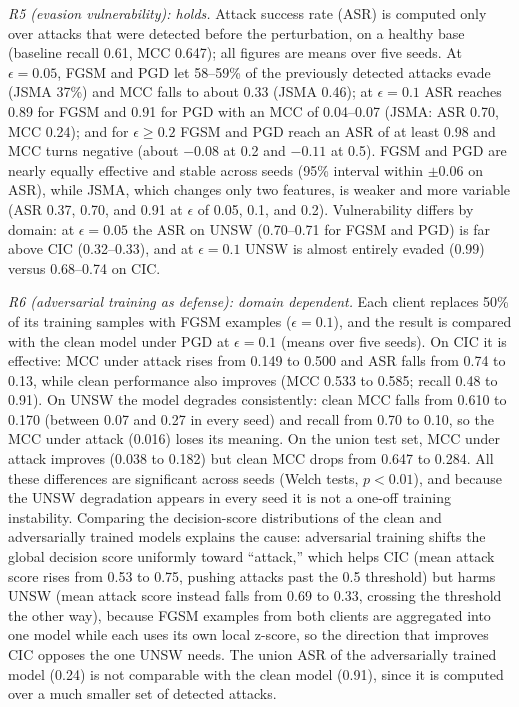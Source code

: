 \documentclass[conference]{IEEEtran}
\begin{document}
\textit{R5 (evasion vulnerability): holds.} Attack success rate (ASR) is computed only over
attacks that were detected before the perturbation, on a healthy base (baseline recall 0.61,
MCC 0.647); all figures are means over five seeds. At $\epsilon{=}0.05$, FGSM and PGD let
58--59\% of the previously detected attacks evade (JSMA 37\%) and MCC falls to about 0.33 (JSMA
0.46); at $\epsilon{=}0.1$ ASR reaches 0.89 for FGSM and 0.91 for PGD with an MCC of 0.04--0.07
(JSMA: ASR 0.70, MCC 0.24); and for $\epsilon{\geq}0.2$ FGSM and PGD reach an ASR of at least 0.98
and MCC turns negative (about $-0.08$ at 0.2 and $-0.11$ at 0.5). FGSM and PGD are nearly equally
effective and stable across seeds (95\% interval within $\pm$0.06 on ASR), while JSMA, which
changes only two features, is weaker and more variable (ASR 0.37, 0.70, and 0.91 at $\epsilon$ of
0.05, 0.1, and 0.2). Vulnerability differs by domain: at $\epsilon{=}0.05$ the ASR on UNSW
(0.70--0.71 for FGSM and PGD) is far above CIC (0.32--0.33), and at $\epsilon{=}0.1$ UNSW is
almost entirely evaded (0.99) versus 0.68--0.74 on CIC.

\textit{R6 (adversarial training as defense): domain dependent.} Each client replaces 50\%
of its training samples with FGSM examples ($\epsilon{=}0.1$), and the result is compared with the
clean model under PGD at $\epsilon{=}0.1$ (means over five seeds). On CIC it is effective: MCC
under attack rises from 0.149 to 0.500 and ASR falls from 0.74 to 0.13, while clean performance
also improves (MCC 0.533 to 0.585; recall 0.48 to 0.91). On UNSW the model degrades
consistently: clean MCC falls from 0.610 to 0.170 (between 0.07 and 0.27 in every seed) and
recall from 0.70 to 0.10, so the MCC under attack (0.016) loses its meaning. On the union test
set, MCC under attack improves (0.038 to 0.182) but clean MCC drops from 0.647 to 0.284. All
these differences are significant across seeds (Welch tests, $p{<}0.01$), and because the UNSW
degradation appears in every seed it is not a one-off training instability. Comparing the
decision-score distributions of the clean and adversarially trained models explains the cause:
adversarial training shifts the global decision score uniformly toward ``attack,'' which helps CIC
(mean attack score rises from 0.53 to 0.75, pushing attacks past the 0.5 threshold) but harms UNSW
(mean attack score instead falls from 0.69 to 0.33, crossing the threshold the other way), because
FGSM examples from both clients are aggregated into one model while each uses its own local z-score,
so the direction that improves CIC opposes the one UNSW needs. The union ASR of the adversarially
trained model (0.24) is not comparable with the clean model (0.91), since it is computed over a much
smaller set of detected attacks.
\end{document}
